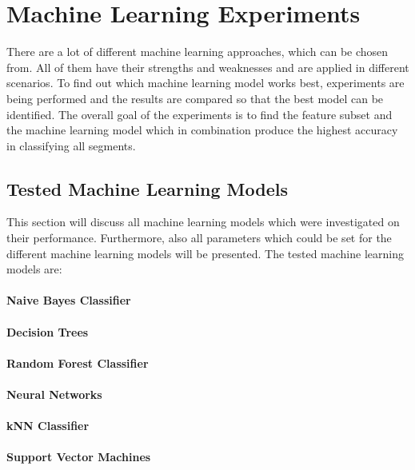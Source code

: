 \section{Machine Learning Experiments}

There are a lot of different machine learning approaches, which can be chosen from. All of them have their strengths and weaknesses and are applied in different scenarios. To find out which machine learning model works best, experiments are being performed and the results are compared so that the best model can be identified. 
The overall goal of the experiments is to find the feature subset and the machine learning model which in combination produce the highest accuracy in classifying all segments. 





\subsection{Tested Machine Learning Models}

This section will discuss all machine learning models which were investigated on their performance. Furthermore, also all parameters which could be set for the different machine learning models will be presented. The tested machine learning models are:


\paragraph{Naive Bayes Classifier}
\paragraph{Decision Trees}
\paragraph{Random Forest Classifier}
\paragraph{Neural Networks}
\paragraph{kNN Classifier}
\paragraph{Support Vector Machines}
